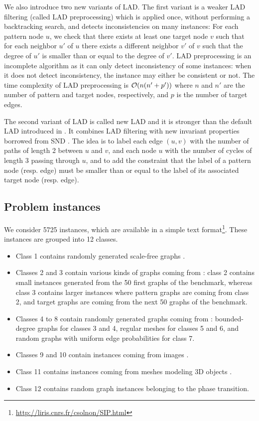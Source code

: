 \documentclass{llncs}
\begin{document}
We also introduce two new variants of LAD. The first variant is a weaker LAD filtering (called LAD
preprocessing) which is applied once, without performing a backtracking search, and detects
inconsistencies on many instances: For each pattern node $u$, we check that there exists at least
one target node $v$ such that for each neighbor $u'$ of $u$ there exists a different neighbor $v'$
of $v$ such that the degree of $u'$ is smaller than or equal to the degree of $v'$. LAD
preprocessing is an incomplete algorithm as it can only detect inconsistency of some instances: when
it does not detect inconsistency, the instance may either be consistent or not. The time complexity
of LAD preprocessing is ${\cal O}(n(n'+p'))$ where $n$ and $n'$ are the number of pattern and target
nodes, respectively, and $p$ is the number of target edges.

The second variant of LAD is called new LAD and it is stronger than the default LAD introduced in
\cite{Solnon:2010}. It combines LAD filtering with new invariant properties borrowed from SND
\cite{Audemard:2014}. The idea is to label each edge $(u,v)$ with the number of paths of length 2
between $u$ and $v$, and each node $u$ with the number of cycles of length 3 passing through $u$,
and to add the constraint that the label of a pattern node (resp. edge) must be smaller than or
equal to the label of its associated target node (resp. edge).

\subsection{Problem instances}

We consider 5725 instances, which are available in a simple text
format\footnote{\url{http://liris.cnrs.fr/csolnon/SIP.html}}. These instances are grouped into 12
classes.

\begin{itemize}
\item Class 1 contains randomly generated scale-free graphs \cite{}.
\item Classes 2 and 3 contain various kinds of graphs coming from \cite{}: class 2 contains small
    instances generated from the 50 first graphs of the benchmark, whereas class 3 contains larger
    instances where pattern graphs are coming from class 2, and target graphs are coming from the
    next 50 graphs of the benchmark.
\item Classes 4 to 8 contain randomly generated graphs coming from \cite{GraphDatabase}:
    bounded-degree graphs for classes 3 and 4, regular meshes for classes 5 and 6, and random graphs
    with uniform edge probabilities for class 7.
\item Classes 9 and 10 contain instances coming from images \cite{}.
\item Class 11 contains instances coming from meshes modeling 3D objects \cite{}.
\item Class 12 contains random graph instances belonging to the phase transition.
\end{itemize}
\end{document}
